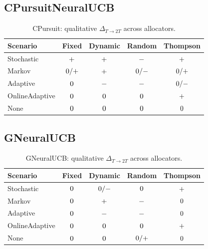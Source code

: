 \documentclass[11pt,a4paper]{article}
\newcommand{\critical}[1]{\textcolor{criticalcolor}{\textbf{#1}}}
\newcommand{\success}[1]{\textcolor{successcolor}{\textbf{#1}}}
\begin{document}
\subsection{CPursuitNeuralUCB}
\begin{table}[H]
\centering
\scriptsize
\begin{tabular}{lcccc}
\toprule
\textbf{Scenario} & \textbf{Fixed} & \textbf{Dynamic} & \textbf{Random} & \textbf{Thompson} \\
\midrule
Stochastic & ${\small +}$ & \success{${\small +}$} & ${\small -}$ & ${\small +}$ \\
Markov & ${\small 0/+}$ & \success{${\small +}$} & ${\small 0/-}$ & ${\small 0/+}$ \\
Adaptive & \success{${\small 0}$} & \critical{${\small -}$} & \critical{${\small -}$} & ${\small 0/-}$ \\
OnlineAdaptive & ${\small 0}$ & ${\small 0}$ & ${\small 0}$ & \success{${\small +}$} \\
None & ${\small 0}$ & ${\small 0}$ & ${\small 0}$ & ${\small 0}$ \\
\bottomrule
\end{tabular}
\caption{CPursuit: qualitative $\Delta_{T\rightarrow 2T}$ across allocators.}
\end{table}

\subsection{GNeuralUCB}
\begin{table}[H]
\centering
\scriptsize
\begin{tabular}{lcccc}
\toprule
\textbf{Scenario} & \textbf{Fixed} & \textbf{Dynamic} & \textbf{Random} & \textbf{Thompson} \\
\midrule
Stochastic & ${\small 0}$ & ${\small 0/-}$ & ${\small 0}$ & \success{${\small +}$} \\
Markov & ${\small 0}$ & ${\small +}$ & \critical{${\small -}$} & ${\small 0}$ \\
Adaptive & \success{${\small 0}$} & \critical{${\small -}$} & \critical{${\small -}$} & ${\small 0}$ \\
OnlineAdaptive & ${\small 0}$ & ${\small 0}$ & ${\small 0}$ & \success{${\small +}$} \\
None & ${\small 0}$ & ${\small 0}$ & ${\small 0/+}$ & ${\small 0}$ \\
\bottomrule
\end{tabular}
\caption{GNeuralUCB: qualitative $\Delta_{T\rightarrow 2T}$ across allocators.}
\end{table}
\end{document}
